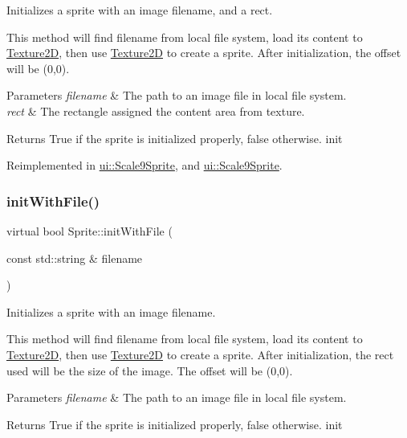 Initializes a sprite with an image filename, and a rect.

This method will find filename from local file system, load its content to \hyperlink{classTexture2D}{Texture2D}, then use \hyperlink{classTexture2D}{Texture2D} to create a sprite. After initialization, the offset will be (0,0).


\begin{DoxyParams}{Parameters}
{\em filename} & The path to an image file in local file system. \\
\hline
{\em rect} & The rectangle assigned the content area from texture. \\
\hline
\end{DoxyParams}
\begin{DoxyReturn}{Returns}
True if the sprite is initialized properly, false otherwise.  init 
\end{DoxyReturn}


Reimplemented in \hyperlink{classui_1_1Scale9Sprite_a8ec4db44e4fdf3b0a4cdfef646dbdd6a}{ui\+::\+Scale9\+Sprite}, and \hyperlink{classui_1_1Scale9Sprite_a33ee4d10ad6015a645f701ddfa2ab4d7}{ui\+::\+Scale9\+Sprite}.

\mbox{\label{classSprite_a4b3471b589c26f4a6b005a50f77db9e8}} 
\subsubsection{\texorpdfstring{init\+With\+File()}{initWithFile()}\hspace{0.1cm}{\footnotesize\ttfamily [3/4]}}
{\footnotesize\ttfamily virtual bool Sprite\+::init\+With\+File (\begin{DoxyParamCaption}\item[{const std\+::string \&}]{filename }\end{DoxyParamCaption})\hspace{0.3cm}{\ttfamily [virtual]}}

Initializes a sprite with an image filename.

This method will find filename from local file system, load its content to \hyperlink{classTexture2D}{Texture2D}, then use \hyperlink{classTexture2D}{Texture2D} to create a sprite. After initialization, the rect used will be the size of the image. The offset will be (0,0).


\begin{DoxyParams}{Parameters}
{\em filename} & The path to an image file in local file system. \\
\hline
\end{DoxyParams}
\begin{DoxyReturn}{Returns}
True if the sprite is initialized properly, false otherwise.  init 
\end{DoxyReturn}


